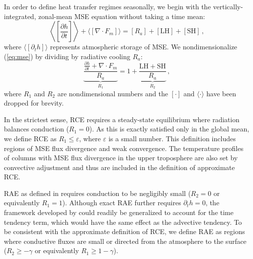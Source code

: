 \documentclass{ametsocV5}
\begin{document}
    In order to define heat transfer regimes seasonally, we begin with the vertically-integrated, zonal-mean MSE equation without taking a time mean:
    \begin{equation} \label{eq:mse}
        \left\langle\left[\frac{\partial h}{\partial t}\right]\right\rangle + \langle [\nabla\cdot F_{m}]\rangle = [R_{a}] + \mathrm{[LH]+[SH]} \, ,
    \end{equation}
    where $\langle[\partial_t h]\rangle$ represents atmospheric storage of MSE. We nondimensionalize (\ref{eq:mse}) by dividing by radiative cooling $R_a$:
    \begin{equation}
        {\underbrace{\frac{\frac{\partial h }{\partial t} + \nabla\cdot F_{m}}{R_{a}}}_{R_1}} = 1 + {\underbrace{\frac{\mathrm{LH+SH}}{R_{a}}}_{R_2}} \, ,
    \end{equation}
    where $R_1$ and $R_2$ are nondimensional numbers and the $[\cdot]$ and $\langle\cdot\rangle$ have been dropped for brevity. 

    In the strictest sense, RCE requires a steady-state equilibrium where radiation balances conduction (\(R_{1}=0\)). As this is exactly satisfied only in the global mean, we define RCE as \(R_{1}\le \varepsilon\), where $\varepsilon$ is a small number. This definition includes regions of MSE flux divergence and weak convergence. The temperature profiles of columns with MSE flux divergence in the upper troposphere are also set by convective adjustment \citep{warren2020} and thus are included in the definition of approximate RCE.

    RAE as defined in \cite{cronin2016} requires conduction to be negligibly small (\(R_{2}=0\) or equivalently \(R_{1}=1\)). Although exact RAE further requires $\partial_t h=0$, the framework developed by \cite{cronin2016} could readily be generalized to account for the time tendency term, which would have the same effect as the advective tendency. To be consistent with the approximate definition of RCE, we define RAE as regions where conductive fluxes are small or directed from the atmosphere to the surface (\(R_{2} \ge -\gamma \) or equivalently \(R_{1} \ge 1-\gamma\)).
\end{document}
